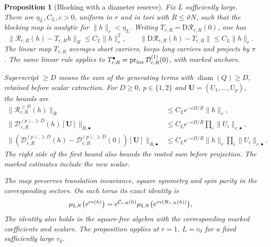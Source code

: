 \documentclass[11pt]{article}
\newtheorem{proposition}{Proposition}[section]
\theoremstyle{definition}
\begin{document}
\begin{proposition}[Blocking with a diameter reserve]
\label{prop:blocking}
Fix \(L\) sufficiently large. There are \(\eta_L,C_L,c>0\),
uniform in \(r\) and in tori with \(R\le\vartheta N\), such
that the blocking map is analytic for \(\|h\|_r<\eta_L\).
Writing \(T_{r,R}=\mathrm D\mathcal R_{r,R}(0)\), one has
\begin{equation}
 \|\mathcal R_{r,R}(h)-T_{r,R}h\|_R\le C_L\|h\|_r^2,
 \qquad
 \|\mathrm D\mathcal R_{r,R}(h)-T_{r,R}\|\le C_L\|h\|_r .
 \label{eq:blocking-quadratic}
\end{equation}
The linear map \(T_{r,R}\) averages short carriers, keeps long
carriers and projects by \(\pi\). The same linear rule applies
to \(T^\bullet_{r,R}=\operatorname{pr}_{\rm list}
\mathcal D^{(1)}_{r,R}(0)\), with marked anchors.

Superscript \(\ge D\) means the sum of the generating terms
with \(\operatorname{diam}(Q)\ge D\), retained before scalar
extraction. For \(D\ge0\), \(p\in\{1,2\}\) and
\(\mathbf U=(U_1,\dots,U_p)\), the bounds are
\begin{equation}
\begin{aligned}
 \|\mathcal R_{r,R}^{\ge D}(h)\|_R
    &\le C_L e^{-cD/R}\|h\|_r,\\
 \|\mathcal D^{(p),\ge D}_{r,R}(h)[\mathbf U]\|_{R,\bullet}
    &\le C_L e^{-cD/R}\prod_i\|U_i\|_{r,\bullet},\\
 \|(\mathcal D^{(p),\ge D}_{r,R}(h)-
       \mathcal D^{(p),\ge D}_{r,R}(0))[\mathbf U]\|_{R,\bullet}
    &\le C_L e^{-cD/R}\|h\|_r\prod_i\|U_i\|_{r,\bullet}.
\end{aligned}
\label{eq:blocking-diameter}
\end{equation}
The right side of the first bound also bounds the rooted sum
before projection.
The marked estimates include the new scalar.

The map preserves translation invariance, square symmetry and
spin parity in the corresponding sectors. On each torus its
exact identity is
\begin{equation}
 \mu_{{\rm I},N}\bigl(e^{\operatorname{ev}(h)}\bigr)
    =e^{\mathcal C_{r,R}(h)}
      \mu_{{\rm I},N}\bigl(e^{\operatorname{ev}(\mathcal R_{r,R}(h))}\bigr),
 \label{eq:blocking-partition}
\end{equation}
The identity also holds in the square-free algebra with the
corresponding marked coefficients and scalars. The proposition
applies at \(r=1,\ L=r_0\) for a fixed sufficiently large \(r_0\).
\end{proposition}
\end{document}

